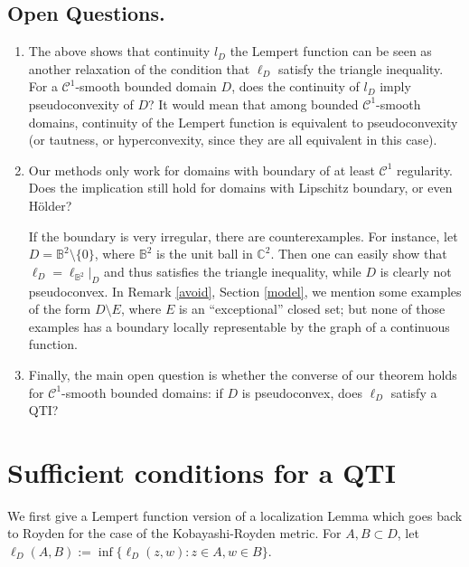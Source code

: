 \documentclass[a4paper,12pt]{amsart}
\def\B{\mathbb B}
\def\C{\mathbb C}
\begin{document}
\subsection{Open Questions.}
\begin{enumerate}
\item
The above shows that continuity $l_D$ the Lempert function can be seen as another relaxation of
the condition that $\ell_D$ satisfy the triangle inequality. For a $\mathcal C^1$-smooth bounded
domain $D$, does the continuity of $l_D$ imply pseudoconvexity of $D$? It would mean that among bounded
$\mathcal C^1$-smooth domains, continuity of the Lempert function is equivalent
to pseudoconvexity (or tautness, or hyperconvexity, since they are all equivalent in this case).
\item
Our methods only work for domains with boundary of at least $\mathcal C^1$ regularity. Does the
implication still hold for domains with Lipschitz boundary, or even H\"older?

If the boundary is very irregular, there are counterexamples.  For instance, let $D=\B^2 \setminus \{0\}$,
where $\B^2$ is the unit ball in $\C^2$. Then one can easily show  that
$\ell_D=\ell_{\B^2}|_D$ and thus satisfies the triangle inequality, while $D$ is clearly not pseudoconvex.
In Remark \ref{avoid}, Section \ref{model}, we mention some examples of the form $D \setminus E$, where $E$ is an ``exceptional'' closed set;
but none of those examples has a boundary locally representable by the graph of a continuous function.
\item
Finally, the main open question is whether the converse of our theorem holds for $\mathcal C^1$-smooth
bounded domains: if $D$ is pseudoconvex, does $\ell_D$ satisfy a QTI?

\end{enumerate}


\section{Sufficient conditions for a QTI}
\label{suffcond}

We first give a Lempert function version of a localization Lemma which goes back to Royden \cite{R}
for the case of the Kobayashi-Royden metric. For $A,B \subset D$, let
$\ell_D(A,B):= \inf\{ \ell_D(z,w): z\in A, w\in B\}$.
\end{document}
